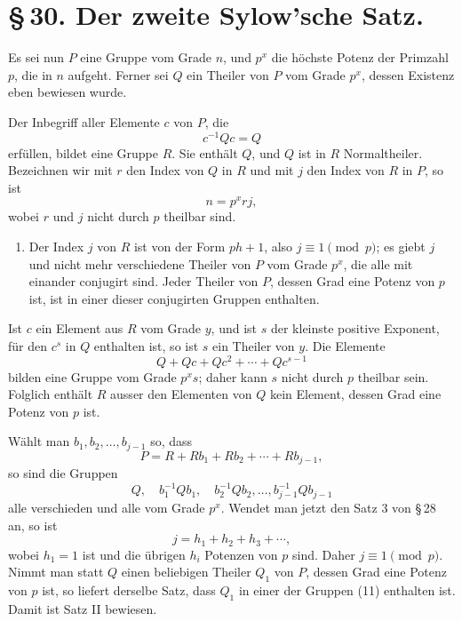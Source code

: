 \documentclass[11pt]{article}
\begin{document}
\section*{\S\,30. Der zweite Sylow'sche Satz.}

Es sei nun $P$ eine Gruppe vom Grade $n$, und $p^x$ die höchste Potenz der Primzahl $p$, die in $n$ aufgeht. Ferner sei $Q$ ein Theiler von $P$ vom Grade $p^x$, dessen Existenz eben bewiesen wurde.

Der Inbegriff aller Elemente $c$ von $P$, die
\begin{equation}
c^{-1}Qc=Q
\tag{1}
\end{equation}
erfüllen, bildet eine Gruppe $R$. Sie enthält $Q$, und $Q$ ist in $R$ Normaltheiler. Bezeichnen wir mit $r$ den Index von $Q$ in $R$ und mit $j$ den Index von $R$ in $P$, so ist
\begin{equation}
n=p^x rj,
\tag{2}
\end{equation}
wobei $r$ und $j$ nicht durch $p$ theilbar sind.

\begin{enumerate}[label=\Roman*.,leftmargin=2.4em,start=2]
\item Der Index $j$ von $R$ ist von der Form $ph+1$, also $j\equiv1\pmod p$; es giebt $j$ und nicht mehr verschiedene Theiler von $P$ vom Grade $p^x$, die alle mit einander conjugirt sind. Jeder Theiler von $P$, dessen Grad eine Potenz von $p$ ist, ist in einer dieser conjugirten Gruppen enthalten.
\end{enumerate}

Ist $c$ ein Element aus $R$ vom Grade $y$, und ist $s$ der kleinste positive Exponent, für den $c^s$ in $Q$ enthalten ist, so ist $s$ ein Theiler von $y$. Die Elemente
\[
Q+Qc+Qc^2+\cdots+Qc^{s-1}
\]
bilden eine Gruppe vom Grade $p^xs$; daher kann $s$ nicht durch $p$ theilbar sein. Folglich enthält $R$ ausser den Elementen von $Q$ kein Element, dessen Grad eine Potenz von $p$ ist.

Wählt man $b_1,b_2,
\ldots,b_{j-1}$ so, dass
\begin{equation}
P=R+Rb_1+Rb_2+\cdots+Rb_{j-1},
\tag{10}
\end{equation}
so sind die Gruppen
\begin{equation}
Q,\quad b_1^{-1}Qb_1,\quad b_2^{-1}Qb_2,\ldots,b_{j-1}^{-1}Qb_{j-1}
\tag{11}
\end{equation}
alle verschieden und alle vom Grade $p^x$. Wendet man jetzt den Satz 3 von \S\,28 an, so ist
\[
j=h_1+h_2+h_3+
\cdots,
\]
wobei $h_1=1$ ist und die übrigen $h_i$ Potenzen von $p$ sind. Daher $j\equiv1\pmod p$. Nimmt man statt $Q$ einen beliebigen Theiler $Q_1$ von $P$, dessen Grad eine Potenz von $p$ ist, so liefert derselbe Satz, dass $Q_1$ in einer der Gruppen (11) enthalten ist. Damit ist Satz II bewiesen.
\end{document}
